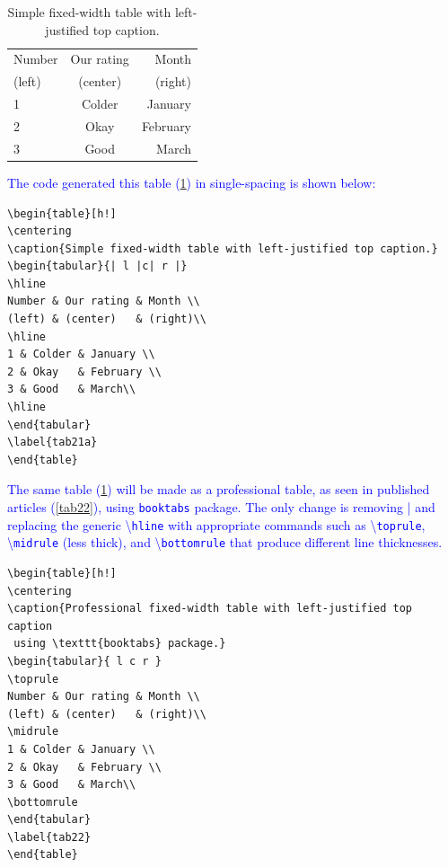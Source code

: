 \documentclass[phd,showgrids]{ndsu-thesis-2022}
\newcommand\italk[1]{\textcolor{blue}{#1}}  %
\newcommand\cmd[1]{\textbackslash\texttt{#1}}  %
\begin{document}
\begin{table}[h!]
\centering
\caption{Simple fixed-width table with left-justified top caption.}
\begin{tabular}{| l |c| r |}
\hline
Number & Our rating & Month \\
(left) & (center)   & (right)\\
\hline
1 & Colder & January \\
2 & Okay   & February \\
3 & Good   & March\\
\hline
\end{tabular}
\label{tab21}
\end{table}

\italk{The code generated this table (\cref{tab21}) in single-spacing is shown below:}

{\singlespacing
\begin{verbatim}
\begin{table}[h!]
\centering
\caption{Simple fixed-width table with left-justified top caption.}
\begin{tabular}{| l |c| r |}
\hline
Number & Our rating & Month \\
(left) & (center)   & (right)\\
\hline
1 & Colder & January \\
2 & Okay   & February \\
3 & Good   & March\\
\hline
\end{tabular}
\label{tab21a}
\end{table}
\end{verbatim}
}

\italk{The same table (\cref{tab21}) will be made as a professional table, as seen in published articles (\cref{tab22}), using \texttt{booktabs} package. The only change is removing | and replacing the generic \cmd{hline} with appropriate commands such as \cmd{toprule}, \cmd{midrule} (less thick), and \cmd{bottomrule} that produce different line thicknesses.
}

{\singlespacing
\begin{verbatim}
\begin{table}[h!]
\centering
\caption{Professional fixed-width table with left-justified top caption
 using \texttt{booktabs} package.}
\begin{tabular}{ l c r }
\toprule
Number & Our rating & Month \\
(left) & (center)   & (right)\\
\midrule
1 & Colder & January \\
2 & Okay   & February \\
3 & Good   & March\\
\bottomrule
\end{tabular}
\label{tab22}
\end{table}
\end{verbatim}
}\label{tabcode22}
\end{document}

